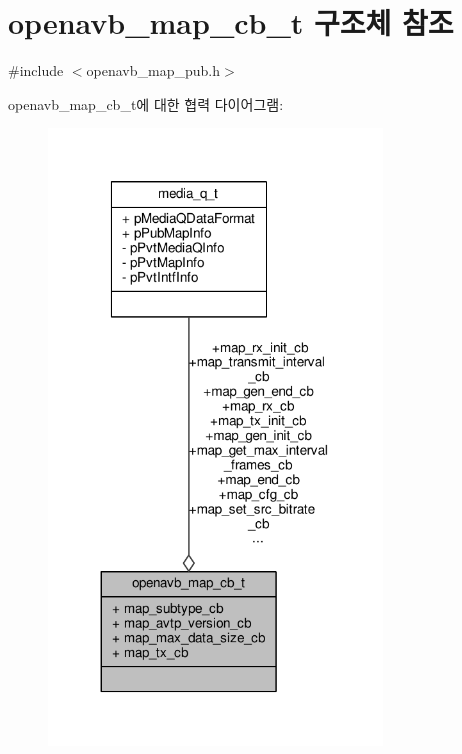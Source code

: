 \hypertarget{structopenavb__map__cb__t}{}\section{openavb\+\_\+map\+\_\+cb\+\_\+t 구조체 참조}
\label{structopenavb__map__cb__t}


{\ttfamily \#include $<$openavb\+\_\+map\+\_\+pub.\+h$>$}



openavb\+\_\+map\+\_\+cb\+\_\+t에 대한 협력 다이어그램\+:
\nopagebreak
\begin{figure}[H]
\begin{center}
\leavevmode
\includegraphics[width=251pt]{structopenavb__map__cb__t__coll__graph}
\end{center}
\end{figure}
